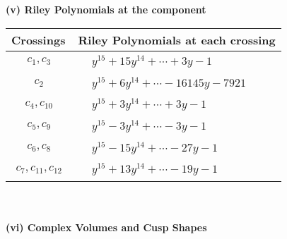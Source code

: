 \documentclass[1p]{elsarticle_modified}
\theoremstyle{definition}
\begin{document}
\newpage\renewcommand{\arraystretch}{1}
\flushleft \textbf{(v) Riley Polynomials at the component}\newline \\
\begin{tabular}{m{50pt}|m{274pt}}
Crossings & \hspace{64pt}Riley Polynomials at each crossing \\
\hline $$\begin{aligned}c_{1},c_{3}\end{aligned}$$&$\begin{aligned}
&y^{15}+15 y^{14}+\cdots+3 y-1
\end{aligned}$\\
\hline $$\begin{aligned}c_{2}\end{aligned}$$&$\begin{aligned}
&y^{15}+6 y^{14}+\cdots-16145 y-7921
\end{aligned}$\\
\hline $$\begin{aligned}c_{4},c_{10}\end{aligned}$$&$\begin{aligned}
&y^{15}+3 y^{14}+\cdots+3 y-1
\end{aligned}$\\
\hline $$\begin{aligned}c_{5},c_{9}\end{aligned}$$&$\begin{aligned}
&y^{15}-3 y^{14}+\cdots-3 y-1
\end{aligned}$\\
\hline $$\begin{aligned}c_{6},c_{8}\end{aligned}$$&$\begin{aligned}
&y^{15}-15 y^{14}+\cdots-27 y-1
\end{aligned}$\\
\hline $$\begin{aligned}c_{7},c_{11},c_{12}\end{aligned}$$&$\begin{aligned}
&y^{15}+13 y^{14}+\cdots-19 y-1
\end{aligned}$\\
\hline
\end{tabular}\\~\\
\newpage\flushleft \textbf{(vi) Complex Volumes and Cusp Shapes}
\end{document}
